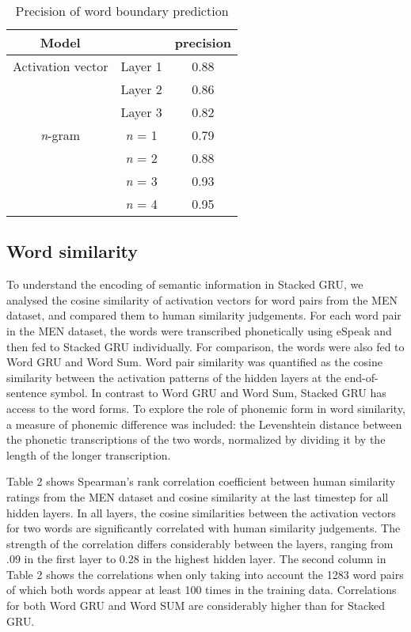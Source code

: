 \begin{table}[]
	\centering
	\begin{tabular}{ccc}
		Model & & precision \\
		\hline
		Activation vector & Layer 1 & 0.88 \\
		& Layer 2 & 0.86 \\
		& Layer 3 & 0.82 \\
		\hline
		\textit{n}-gram & \textit{n} = 1 & 0.79 \\
		& \textit{n} = 2 & 0.88 \\
		& \textit{n} = 3 & 0.93 \\
		& \textit{n} = 4 & 0.95
	\end{tabular}
	\caption{Precision of word boundary prediction}
\end{table}

\subsection{Word similarity}
To understand the encoding of semantic information in {\sc Stacked GRU}, we analysed the cosine similarity of activation vectors for word pairs from the MEN dataset, and compared them to human similarity judgements.
For each word pair in the MEN dataset, the words were transcribed phonetically using eSpeak and then fed to {\sc Stacked GRU} individually. For comparison, the words were also fed to {\sc Word GRU} and {\sc Word Sum}. Word pair similarity was quantified as the cosine similarity between the activation patterns of the hidden layers at the end-of-sentence symbol.
In contrast to {\sc Word GRU} and {\sc Word Sum}, {\sc Stacked GRU} has access to the word forms. To explore the role of phonemic form in word similarity, a measure of phonemic difference was included: the Levenshtein distance between the phonetic transcriptions of the two words, normalized by dividing it by the length of the longer transcription. 

Table 2 shows Spearman's rank correlation coefficient between human similarity ratings from the MEN dataset and cosine similarity at the last timestep for all hidden layers. In all layers, the cosine similarities between the activation vectors for two words are significantly correlated with human similarity judgements. The strength of the correlation differs considerably between the layers, ranging from .09 in the first layer to 0.28 in the highest hidden layer. The second column in Table 2 shows the correlations when only taking into account the 1283 word pairs of which both words appear at least 100 times in the training data. 
Correlations for both {\sc Word GRU} and {\sc Word SUM} are considerably higher than for {\sc Stacked GRU}.

